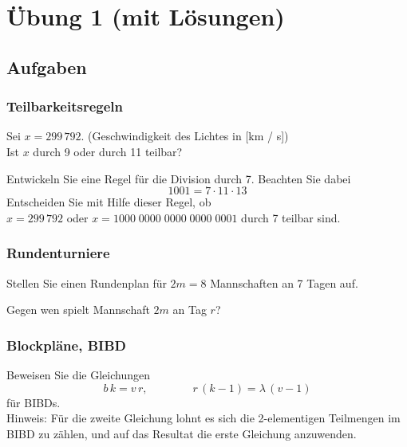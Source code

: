 \section{Übung 1 (mit Lösungen)}
\subsection{Aufgaben}

\subsubsection*{Teilbarkeitsregeln}

\begin{aufgabe}[1]
Sei $x = 299\,792$. \quad (Geschwindigkeit des Lichtes in [km / s])\\
Ist $x$ durch 9 oder durch 11 teilbar?
\end{aufgabe}

\begin{aufgabe}[2]
Entwickeln Sie eine Regel für die Division durch 7. Beachten Sie dabei
\[ 1001 = 7 \cdot 11 \cdot 13 \]
Entscheiden Sie mit Hilfe dieser Regel, ob\\
$x = 299\,792$ oder $x = 1000\;0000\;0000\;0000\;0001$ durch 7 teilbar sind.
\end{aufgabe}

\subsubsection*{Rundenturniere}

\begin{aufgabe}[3]
Stellen Sie einen Rundenplan für $2m = 8$ Mannschaften an 7 Tagen auf.
\end{aufgabe}

\begin{aufgabe}[4]
Gegen wen spielt Mannschaft $2m$ an Tag $r$?
\end{aufgabe}

\subsubsection*{Blockpläne, BIBD}

\begin{aufgabe}[5]
Beweisen Sie die Gleichungen
\[ b\,k = v\,r, \qquad\qquad r\,(k-1) = \lambda\,(v-1) \]
für BIBDs.\\
Hinweis: Für die zweite Gleichung lohnt es sich die 2-elementigen Teilmengen im BIBD zu zählen, und auf das Resultat die erste Gleichung anzuwenden.
\end{aufgabe}

